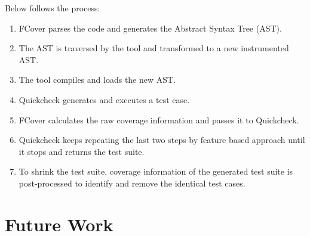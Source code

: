 \documentclass[12pt,a4paper]{report}
\begin{document}
Below follows the process:
\begin{enumerate}
 \item FCover parses the code and generates the Abstract Syntax Tree (AST).
 \item The AST is traversed by the tool and transformed to a new instrumented AST.
 \item The tool compiles and loads the new AST.
 \item Quickcheck generates and executes a test case.
 \item FCover calculates the raw coverage information and passes it to Quickcheck.
 \item Quickcheck keeps repeating the last two steps by feature based approach until it stops and returns the test suite.  
 \item To shrink the test suite, coverage information of the generated test suite is post-processed to identify and remove the identical test cases.
\end{enumerate}
\newpage
\chapter{Future Work}
\newpage
{}


\end{document}
